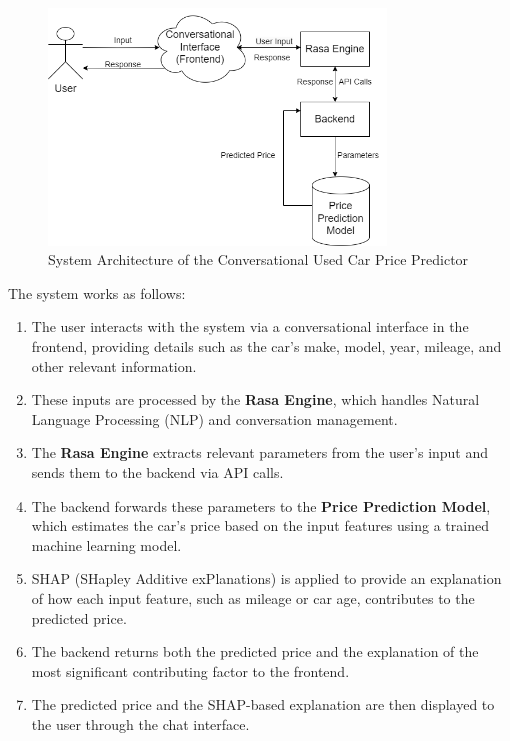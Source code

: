 \documentclass[a4paper,12pt]{article}
\begin{document}
\begin{figure}[h]
    \centering
    \includegraphics[width=0.8\textwidth]{Midsem.drawio.png}
    \caption{System Architecture of the Conversational Used Car Price Predictor}
    \label{fig:architecture}
\end{figure}

The system works as follows:
\begin{enumerate}
    \item The user interacts with the system via a conversational interface in the frontend, providing details such as the car’s make, model, year, mileage, and other relevant information.
    \item These inputs are processed by the \textbf{Rasa Engine}, which handles Natural Language Processing (NLP) and conversation management.
    \item The \textbf{Rasa Engine} extracts relevant parameters from the user's input and sends them to the backend via API calls.
    \item The backend forwards these parameters to the \textbf{Price Prediction Model}, which estimates the car's price based on the input features using a trained machine learning model.
    \item SHAP (SHapley Additive exPlanations) is applied to provide an explanation of how each input feature, such as mileage or car age, contributes to the predicted price.
    \item The backend returns both the predicted price and the explanation of the most significant contributing factor to the frontend.
    \item The predicted price and the SHAP-based explanation are then displayed to the user through the chat interface.
\end{enumerate}
\end{document}
